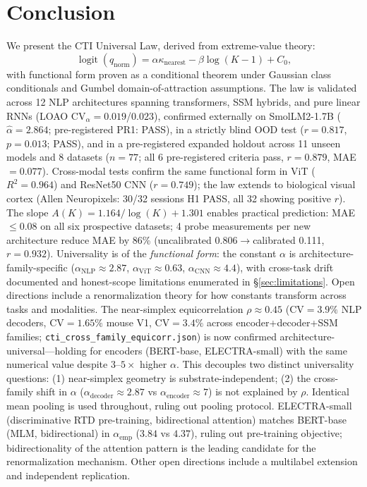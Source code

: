 \documentclass{article}
\DeclareMathOperator{\logit}{logit}
\begin{document}
\section{Conclusion}
We present the CTI Universal Law, derived from extreme-value theory:
\[
\logit(q_{\mathrm{norm}})=\alpha\kappa_{\mathrm{nearest}}-\beta\log(K-1)+C_0,
\]
with functional form proven as a conditional theorem under Gaussian class conditionals and Gumbel domain-of-attraction assumptions.
The law is validated across 12 NLP architectures spanning transformers, SSM hybrids, and pure linear RNNs (LOAO $\mathrm{CV}_\alpha=0.019$/$0.023$), confirmed externally on SmolLM2-1.7B ($\hat\alpha=2.864$; pre-registered PR1: PASS), in a strictly blind OOD test ($r=0.817$, $p=0.013$; PASS), and in a pre-registered expanded holdout across 11 unseen models and 8 datasets ($n=77$; all 6 pre-registered criteria pass, $r=0.879$, MAE$=0.077$).
Cross-modal tests confirm the same functional form in ViT ($R^2=0.964$) and ResNet50 CNN ($r=0.749$); the law extends to biological visual cortex (Allen Neuropixels: 30/32 sessions H1 PASS, all 32 showing positive $r$).
The slope $A(K)=1.164/\log(K)+1.301$ enables practical prediction: MAE$\leq$0.08 on all six prospective datasets; 4 probe measurements per new architecture reduce MAE by 86\% (uncalibrated 0.806$\to$calibrated 0.111, $r=0.932$).
Universality is of the \emph{functional form}: the constant $\alpha$ is architecture-family-specific ($\alpha_\mathrm{NLP}\approx2.87$, $\alpha_\mathrm{ViT}\approx0.63$, $\alpha_\mathrm{CNN}\approx4.4$), with cross-task drift documented and honest-scope limitations enumerated in \S\ref{sec:limitations}.
Open directions include a renormalization theory for how constants transform across tasks and modalities.
The near-simplex equicorrelation $\rho\approx0.45$ (CV$=3.9\%$ NLP decoders, CV$=1.65\%$ mouse V1, CV$=3.4\%$ across encoder+decoder+SSM families; \texttt{cti\_cross\_family\_equicorr.json}) is now confirmed architecture-universal---holding for encoders (BERT-base, ELECTRA-small) with the same numerical value despite $3$--$5\times$ higher $\alpha$.
This decouples two distinct universality questions: (1) near-simplex geometry is substrate-independent; (2) the cross-family shift in $\alpha$ ($\alpha_\mathrm{decoder}\approx2.87$ vs $\alpha_\mathrm{encoder}\approx7$) is not explained by $\rho$. Identical mean pooling is used throughout, ruling out pooling protocol. ELECTRA-small (discriminative RTD pre-training, bidirectional attention) matches BERT-base (MLM, bidirectional) in $\alpha_\mathrm{emp}$ ($3.84$ vs $4.37$), ruling out pre-training objective; bidirectionality of the attention pattern is the leading candidate for the renormalization mechanism.
Other open directions include a multilabel extension and independent replication.
\end{document}
